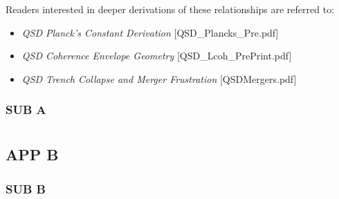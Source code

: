 \documentclass[entropy,article,submit,pdftex,moreauthors]{Definitions/mdpi}
\begin{document}
Readers interested in deeper derivations of these relationships are referred to:
\begin{itemize}
  \item \textit{QSD Planck’s Constant Derivation} [QSD\_Plancks\_Pre.pdf]
  \item \textit{QSD Coherence Envelope Geometry} [QSD\_Lcoh\_PrePrint.pdf]
  \item \textit{QSD Trench Collapse and Merger Frustration} [QSDMergers.pdf]
\end{itemize}


\subsubsection{SUB A}

\section[\appendixname~\thesection]{}
\subsection[\appendixname~\thesubsection]{APP B}

\subsubsection{SUB B}
\end{document}
